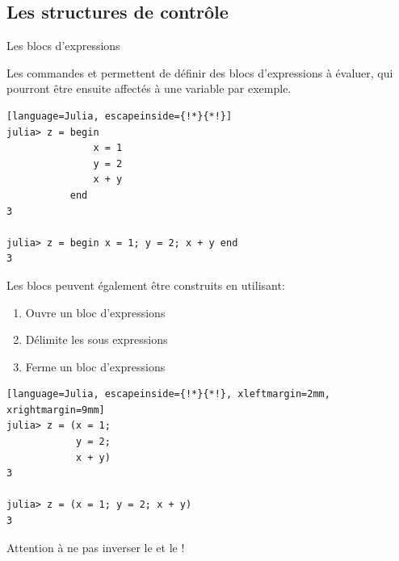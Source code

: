 \subsection{Les structures de contrôle}
\begin{frame}[containsverbatim]{Les blocs d'expressions}
\par{Les commandes  et  permettent de définir des blocs d'expressions à évaluer, qui pourront être ensuite affectés à une variable par exemple.}
\begin{lstlisting}[language=Julia, escapeinside={!*}{*!}]
julia> z = begin
               x = 1
               y = 2
               x + y
           end
3

julia> z = begin x = 1; y = 2; x + y end
3
\end{lstlisting}
\par{Les blocs peuvent également être construits en utilisant:}\vspace{-2ex}
\begin{multicols}{2}
\begin{enumerate}
\item[\cmdb{(}] Ouvre un bloc d'expressions
\item[\cmdb{\hspace{-0.5ex};}] Délimite les sous expressions
\item[\cmdb{)}] Ferme un bloc d'expressions
\end{enumerate}
\columnbreak
\begin{lstlisting}[language=Julia, escapeinside={!*}{*!}, xleftmargin=2mm, xrightmargin=9mm]
julia> z = (x = 1;
            y = 2;
            x + y)
3

julia> z = (x = 1; y = 2; x + y)
3
\end{lstlisting}
\end{multicols}\vspace{-2ex}
\par{\textcolor{firebrick2}{Attention à ne pas inverser le} \cmdb{,} \textcolor{firebrick2}{et le} \cmdb{;}\textcolor{firebrick2}{!}}
\end{frame}


